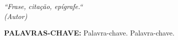 \documentclass[
  12pt,		%
  a4paper,	%
  openright,%
  oneside,	%
  chapter=TITLE,		%
  section=TITLE,		%
  english,	%
  french,	%
  spanish,	%
  brazil
]{abntex2}
\begin{document}
    
    \begin{epigrafe}
        \vspace*{\fill}
    	\begin{flushright}
    		\textit{
        		``Frase, citação, epígrafe.``\\
        		(Autor)
    		}
    	\end{flushright}
    \end{epigrafe}
    
    
    \begin{resumo}
    
        \lipsum[1] %
        
        \vspace*{0.5cm}
    
        \noindent\textbf{\MakeUppercase{Palavras-Chave: }} Palavra-chave. Palavra-chave.
    
    \end{resumo}
    
    
\end{document}
